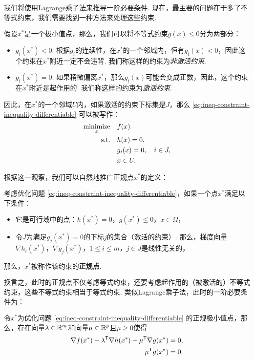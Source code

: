 我们将使用Lagrange乘子法来推导一阶必要条件. 现在，最主要的问题在于多了不等式约束，我们需要找到一种方法来处理这些约束.

假设$x^*$是一个极小值点，那么，我们可以将不等式约束$g(x)\leq 0$分为两部分：
\begin{itemize}
    \item $g_i(x^*)<0$. 根据$g_i$的连续性，在$x^*$的一个邻域内，恒有$g_i(x)<0$，因此这个约束在$x^*$附近一定不会违背. 我们称这样的约束为\textit{非激活约束}.
    \item $g_i(x^*)=0$. 如果稍微偏离$x^*$，那么$g_i(x)$可能会变成正数，因此，这个约束在$x^*$附近是起作用的. 我们称这样的约束为\textit{激活约束}.
\end{itemize}

因此，在$x^*$的一个邻域$U$内，如果激活的约束下标集是$J$，那么 \eqref{eq:ineq-constraint-inequality-differentiable} 可以被写作：
\begin{equation}
\begin{aligned}
    \operatorname*{minimize}_x\quad& f(x) \\
    \text{s.t.}\quad& h(x)=0, \\
    &g_i(x)=0, \quad i\in J,\\
    & x \in U.
\end{aligned}
\label{eq:ineq-constraint-inequality-differentiable-active}
\end{equation}

根据这一观察，我们可以自然地推广正规点$x^*$的定义：
\begin{definition}[正规点]
考虑优化问题 \eqref{eq:ineq-constraint-inequality-differentiable}，如果一个点$x^*$满足以下条件：
\begin{itemize}
    \item 它是可行域中的点：$h(x^*)=0$，$g(x^*)\leq 0$，$x\in\Omega$，
    \item 令$J$为满足$g_j(x^*)=0$的下标$j$的集合（激活的约束）. 那么，梯度向量$\nabla h_i(x^*)$，$\nabla g_j(x^*)$，$1\leq i \leq m$，$j\in J$是线性无关的，
\end{itemize}
那么，$x^*$被称作该约束的\textbf{正规点}.
\end{definition}

换言之，此时的正规点不仅考虑等式约束，还要考虑起作用的（被激活的）不等式约束，这些不等式约束相当于等式约束. 类似Lagrange乘子法，此时的一阶必要条件为：

\begin{theorem}\label{thm:KKT}
令$x^*$为优化问题 \eqref{eq:ineq-constraint-inequality-differentiable} 的正规极小值点，那么，存在向量$\lambda\in\mathbb{R}^m$和向量$\mu\in \mathbb{R}^p$且$\mu\geq 0$使得
\begin{align}
    \nabla f(x^*)+\lambda^{\mathsf{T}} \nabla {h(x^*)}+\mu^{\mathsf{T}} \nabla g(x^*)&=0,\label{eq:KKT-1}\\
    {\mu^{\mathsf{T}} g(x^*)}&=0.\label{eq:KKT-2}
\end{align}
\end{theorem}

